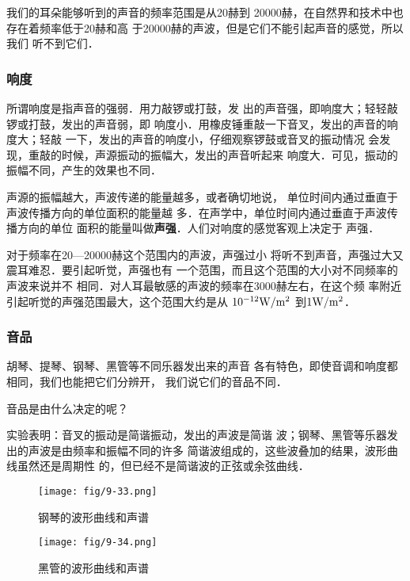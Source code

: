 我们的耳朵能够听到的声音的频率范围是从20赫到
20000赫，在自然界和技术中也存在着频率低于20赫和高
于20000赫的声波，但是它们不能引起声音的感觉，所以我们
听不到它们．


\subsubsection{响度}
所谓响度是指声音的强弱．用力敲锣或打鼓，发
出的声音强，即响度大；轻轻敲锣或打鼓，发出的声音弱，即
响度小．用橡皮锤重敲一下音叉，发出的声音的响度大；轻敲
一下，发出的声音的响度小，仔细观察锣鼓或音叉的振动情况
会发现，重敲的时候，声源振动的振幅大，发出的声音听起来
响度大．可见，振动的振幅不同，产生的效果也不同．

声源的振幅越大，声波传递的能量越多，或者确切地说，
单位时间内通过垂直于声波传播方向的单位面积的能量越
多．在声学中，单位时间内通过垂直于声波传播方向的单位
面积的能量叫做\textbf{声强}．人们对响度的感觉客观上决定于
声强．

对于频率在20—20000赫这个范围内的声波，声强过小
将听不到声音，声强过大又震耳难忍．要引起听觉，声强也有
一个范围，而且这个范围的大小对不同频率的声波来说并不
相同．对人耳最敏感的声波的频率在3000赫左右，在这个频
率附近引起听觉的声强范围最大，这个范围大约是从
$10^{-12}{\rm W}/{\rm m^2}$
到$1{\rm W}/{\rm m^2}$．

\subsubsection{音品}

胡琴、提琴、钢琴、黑管等不同乐器发出来的声音
各有特色，即使音调和响度都相同，我们也能把它们分辨开，
我们说它们的音品不同．

音品是由什么决定的呢？

实验表明：音叉的振动是简谐振动，发出的声波是简谐
波；钢琴、黑管等乐器发出的声波是由频率和振幅不同的许多
简谐波组成的，这些波叠加的结果，波形曲线虽然还是周期性
的，但已经不是简谐波的正弦或余弦曲线．
    \begin{figure}[htp]\centering
        \begin{minipage}[t]{0.48\textwidth}
            \centering
            \texttt{[image: fig/9-33.png]}
            \caption{钢琴的波形曲线和声谱}
        \end{minipage}
        \begin{minipage}[t]{0.48\textwidth}
            \centering
            \texttt{[image: fig/9-34.png]}
            \caption{黑管的波形曲线和声谱}
        \end{minipage}
    \end{figure}



